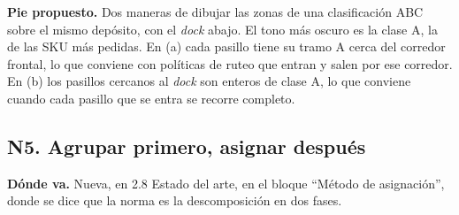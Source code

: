\documentclass[a4paper,10pt]{article}
\newcommand{\donde}[1]{\par\noindent\textbf{Dónde va.} #1\par\smallskip}
\newcommand{\pie}[1]{\par\noindent\textbf{Pie propuesto.} #1\par\smallskip}
\begin{document}
\pie{Dos maneras de dibujar las zonas de una clasificación ABC sobre el mismo
depósito, con el \emph{dock} abajo. El tono más oscuro es la clase A, la de
las SKU más pedidas. En (a) cada pasillo tiene su tramo A cerca del corredor
frontal, lo que conviene con políticas de ruteo que entran y salen por ese
corredor. En (b) los pasillos cercanos al \emph{dock} son enteros de clase A,
lo que conviene cuando cada pasillo que se entra se recorre completo.}

\subsection{N5. Agrupar primero, asignar después}

\donde{Nueva, en 2.8 Estado del arte, en el bloque ``Método de asignación'',
donde se dice que la norma es la descomposición en dos fases.}
\end{document}
